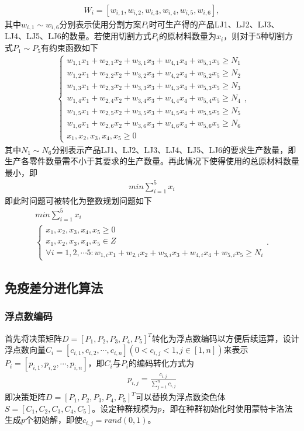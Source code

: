 \documentclass{whutmod}
\begin{document}
  	\begin{gather*}
  W_i=[w_{i,1},w_{i,2},w_{i,3},w_{i,4},w_{i,5},w_{i,6}],  
  \end{gather*}
    其中$w_{i,1} \sim w_{i,6}$分别表示使用分割方案$P_i$时可生产得的产品LJ1、LJ2、LJ3、LJ4、LJ5、LJ6的数量。若使用切割方式$P_i$的原材料数量为$x_i$，则对于$5$种切割方式$P_1 \sim P_5$有约束函数如下 
    	\begin{gather}
  \left\{\begin{matrix}w_{1,1} x_1+w_{2,1} x_2+w_{3,1} x_3+w_{4,1} x_4+w_{5,1} x_5\geqslant N_1
  \\ w_{1,2} x_1+w_{2,2} x_2+w_{3,2} x_3+w_{4,2} x_4+w_{5,2} x_5\geqslant N_2
  \\ w_{1,3} x_1+w_{2,3} x_2+w_{3,3} x_3+w_{4,3} x_4+w_{5,3} x_5\geqslant N_3
  \\ w_{1,4} x_1+w_{2,4} x_2+w_{3,4} x_3+w_{4,4} x_4+w_{5,4} x_5\geqslant N_4
  \\ w_{1,5} x_1+w_{2,5} x_2+w_{3,5} x_3+w_{4,5} x_4+w_{5,5} x_5\geqslant N_5
  \\ w_{1,6} x_1+w_{2,6} x_2+w_{3,6} x_3+w_{4,6} x_4+w_{5,6} x_5\geqslant N_6
  \\x_1,x_2,x_3,x_4,x_5\geqslant 0
  \end{matrix}\right.,
    \end{gather}
    其中$N_1\sim N_6$分别表示产品LJ1、LJ2、LJ3、LJ4、LJ5、LJ6的要求生产数量，即生产各零件数量需不小于其要求的生产数量。再此情况下使得使用的总原材料数量最小，即
    	\begin{gather}
   min\sum_{i=1}^5x_i
    \end{gather}
    即此时问题可被转化为整数规划问题如下
    \begin{gather}
    min\sum_{i=1}^5x_i\\
     \left\{\begin{matrix}
    x_1,x_2,x_3,x_4,x_5\geqslant 0
    \\x_1,x_2,x_3,x_4,x_5\in Z
    \\\forall i=1,2,\cdots5 :w_{1,i} x_1+w_{2,i} x_2+w_{3,i} x_3+w_{4,i} x_4+w_{5,i} x_5\geqslant N_i
    \end{matrix}\right..
    \end{gather}
    \subsection{免疫差分进化算法}
     \subsubsection{浮点数编码}
      首先将决策矩阵$D=[P_1,P_2,P_3,P_4,P_5]^T$转化为浮点数编码以方便后续运算，设计浮点数向量$C_i=[c_{i,1},c_{i,2},\cdots,c_{i,n}](0<c_{i,j}<1,j\in[1,n])$来表示$P_i=[p_{i,1},p_{i,2},\cdots,p_{i,n}]$，即$C_i$与$P_i$的编码转化方式为
      \begin{gather*}
      p_{i,j}=\frac{c_{i,j}}{\sum _{j=1}^n c_{i,j}}
      \end{gather*}
      即决策矩阵$D=[P_1,P_2,P_3,P_4,P_5]^T$可以替换为浮点数染色体$S=[C_1,C_2,C_3,C_4,C_5]$。设定种群规模为$p$，即在种群初始化时使用蒙特卡洛法生成$p$个初始解，即使$c_{i,j}=rand(0,1)$。
\end{document}
